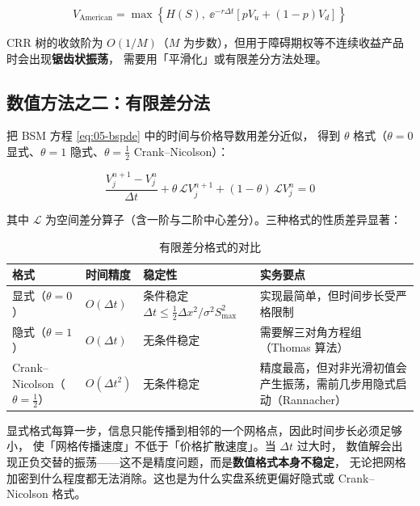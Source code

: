 \begin{equation}
  V_{\text{American}} = \max\left\{H(S), \ \ee^{-r\Delta t}\left[pV_u+(1-p)V_d\right]\right\}
  \label{eq:05-american}
\end{equation}

CRR 树的收敛阶为 $O(1/M)$（$M$ 为步数），但用于障碍期权等不连续收益产品时会出现\textbf{锯齿状振荡}，
需要用「平滑化」或有限差分方法处理。

\subsection{数值方法之二：有限差分法}

把 BSM 方程 \cref{eq:05-bspde} 中的时间与价格导数用差分近似，
得到 $\theta$ 格式（$\theta = 0$ 显式、$\theta = 1$ 隐式、$\theta = \tfrac12$ Crank--Nicolson）：

\begin{equation}
  \frac{V^{n+1}_j - V^{n}_j}{\Delta t}
  + \theta\,\mathcal{L}V^{n+1}_j + (1-\theta)\,\mathcal{L}V^{n}_j = 0
  \label{eq:05-theta}
\end{equation}

其中 $\mathcal{L}$ 为空间差分算子（含一阶与二阶中心差分）。三种格式的性质差异显著：

\begin{table}[htbp]
\centering
\caption{有限差分格式的对比}\label{tab:05-fd}
\tablefont
\begin{tabularx}{\textwidth}{@{}L{2.0cm}L{1.8cm}L{2.6cm}Y@{}}
\toprule
\textbf{格式} & \textbf{时间精度} & \textbf{稳定性} & \textbf{实务要点} \\
\midrule
显式（$\theta=0$） & $O(\Delta t)$ & 条件稳定 $\Delta t \le \tfrac12\Delta x^2/\sigma^2S_{\max}^2$ & 实现最简单，但时间步长受严格限制 \\
隐式（$\theta=1$） & $O(\Delta t)$ & 无条件稳定 & 需要解三对角方程组（Thomas 算法） \\
Crank--Nicolson（$\theta=\tfrac12$） & $O(\Delta t^2)$ & 无条件稳定 & 精度最高，但对非光滑初值会产生振荡，需前几步用隐式启动（Rannacher） \\
\bottomrule
\end{tabularx}
\end{table}

\begin{intuitionbox}[稳定性条件的来源]
显式格式每算一步，信息只能传播到相邻的一个网格点，因此时间步长必须足够小，
使「网格传播速度」不低于「价格扩散速度」。当 $\Delta t$ 过大时，
数值解会出现正负交替的振荡——这不是精度问题，而是\textbf{数值格式本身不稳定}，
无论把网格加密到什么程度都无法消除。这也是为什么实盘系统更偏好隐式或 Crank--Nicolson 格式。
\end{intuitionbox}

